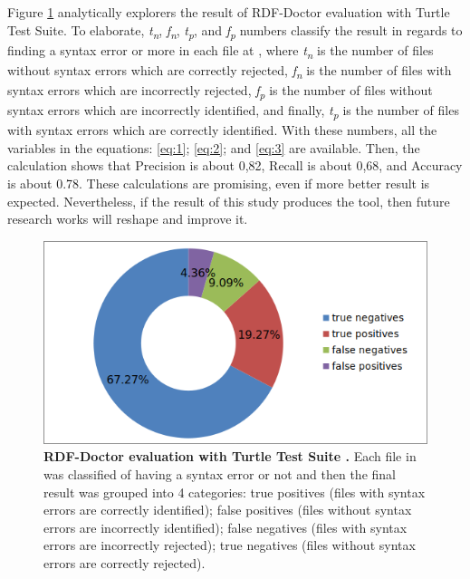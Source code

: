 Figure \ref{Fig:Experiment01} analytically explorers the result of RDF-Doctor evaluation  with Turtle Test Suite. To elaborate, \textit{t\textsubscript{n}}, 
\textit{f\textsubscript{n}}, 
\textit{t\textsubscript{p}}, 
and \textit{f\textsubscript{p}} numbers classify the result in regards to finding a syntax error  or more in each file at \cite{TurtleTests:Online}, where \textit{t\textsubscript{n}} is the number of files without syntax errors which are correctly rejected, \textit{f\textsubscript{n}} is  the number of files  with  syntax  errors  which are  incorrectly  rejected, \textit{f\textsubscript{p}} is the number of
 files without syntax errors  which are incorrectly identified, and finally, \textit{t\textsubscript{p}} is the number of files with syntax errors  which are correctly identified. With these numbers, all the variables in the equations: \ref{eq:1};  \ref{eq:2}; and \ref{eq:3} are available. Then, the calculation shows that Precision is about 0,82,  Recall is about 0,68, and Accuracy is about 0.78. These calculations are promising, even if more better result is expected. Nevertheless, if the result of this study produces the tool, then future research works will reshape and improve it.    
 
 
\begin{figure}
\begin{center}
		\includegraphics[scale=0.6,angle=0,trim=4 4 4 4,clip]{images/Experiment01.png}
		\caption{\textbf{RDF-Doctor evaluation with Turtle Test Suite \cite{TurtleTests:Online}.} Each file in \cite{TurtleTests:Online} was classified of having a syntax error or not and then the final result was grouped into 4 categories: true positives (files with syntax errors are correctly identified); false positives (files without syntax errors are incorrectly identified); false negatives (files with syntax errors are incorrectly rejected); true negatives (files without syntax errors are correctly rejected).}
		\label{Fig:Experiment01}
\end{center}
\end{figure}


